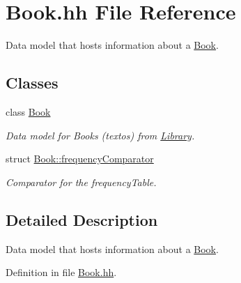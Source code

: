 \hypertarget{_book_8hh}{\section{Book.\-hh File Reference}
\label{_book_8hh}
}


Data model that hosts information about a \hyperlink{class_book}{Book}.  


\subsection*{Classes}
\begin{DoxyCompactItemize}
\item 
class \hyperlink{class_book}{Book}
\begin{DoxyCompactList}\small\item\em Data model for Books (textos) from \hyperlink{class_library}{Library}. \end{DoxyCompactList}\item 
struct \hyperlink{struct_book_1_1frequency_comparator}{Book\-::frequency\-Comparator}
\begin{DoxyCompactList}\small\item\em Comparator for the frequency\-Table. \end{DoxyCompactList}\end{DoxyCompactItemize}


\subsection{Detailed Description}
Data model that hosts information about a \hyperlink{class_book}{Book}. 

Definition in file \hyperlink{_book_8hh_source}{Book.\-hh}.

